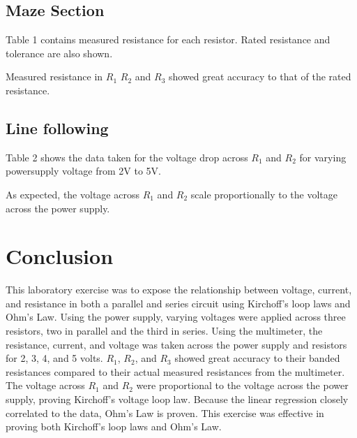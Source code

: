 \documentclass[CMPE]{KGCOEReport}
\begin{document}
\subsection*{Maze Section}

Table 1 contains measured resistance for each resistor. Rated resistance and tolerance are also shown.


Measured resistance in $R_1$ $R_2$ and $R_3$ showed great accuracy to that of the rated resistance. 

\subsection*{Line following}
Table 2 shows the data taken for the voltage drop across $R_1$ and $R_2$ for varying powersupply voltage from 2V to 5V.


As expected, the voltage across $R_1$ and $R_2$ scale proportionally to the voltage across the power supply. 

\section*{Conclusion}

This laboratory exercise was to expose the relationship between voltage, current, and resistance in both a parallel and series circuit using Kirchoff’s loop laws and Ohm’s Law. Using the power supply, varying voltages were applied across three resistors, two in parallel and the third in series. Using the multimeter, the resistance, current, and voltage was taken across the power supply and resistors for 2, 3, 4, and 5 volts. $R_1$, $R_2$, and $R_3$ showed great accuracy to their banded resistances compared to their actual measured resistances from the multimeter. The voltage across $R_1$ and $R_2$ were proportional to the voltage across the power supply, proving Kirchoff’s voltage loop law. Because the linear regression closely correlated to the data, Ohm’s Law is proven. This exercise was effective in proving both Kirchoff’s loop laws and Ohm’s Law.
\end{document}
